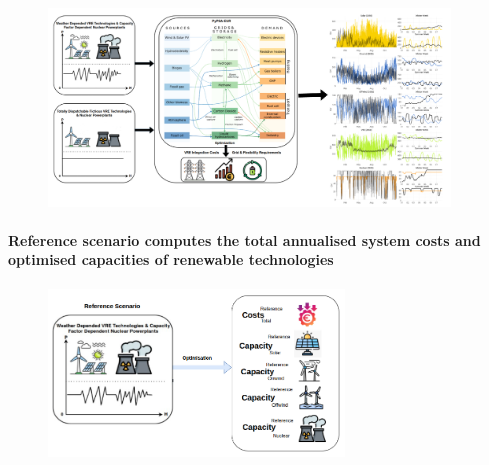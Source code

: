 \documentclass[aspectratio=169]{beamer}
\begin{document}
\begin{frame}{\insertsectionhead}

\begin{figure}
    \centering
    \includegraphics[width=0.95\textwidth]{mtth.png}
  \end{figure}
\end{frame}

\begin{frame}{\insertsectionhead}
\framesubtitle{ Reference scenario computes the total annualised system costs and optimised capacities of renewable technologies}
\begin{figure}
    \centering
    \includegraphics[width=0.7\textwidth]{method1.png}
  
  \end{figure}
\end{frame}
\end{document}
